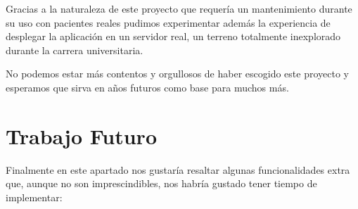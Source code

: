     Gracias a la naturaleza de este proyecto que requería un mantenimiento durante su uso con pacientes reales pudimos experimentar además la experiencia de desplegar la aplicación en un servidor real, un terreno totalmente inexplorado durante la carrera universitaria.
    \newline
    
    No podemos estar más contentos y orgullosos de haber escogido este proyecto y esperamos que sirva en años futuros como base para muchos más. \newpage
    
     \section{Trabajo Futuro}
     
      Finalmente en este apartado nos gustaría resaltar algunas funcionalidades extra que, aunque no son imprescindibles, nos habría gustado tener tiempo de implementar:
 \newline
 
